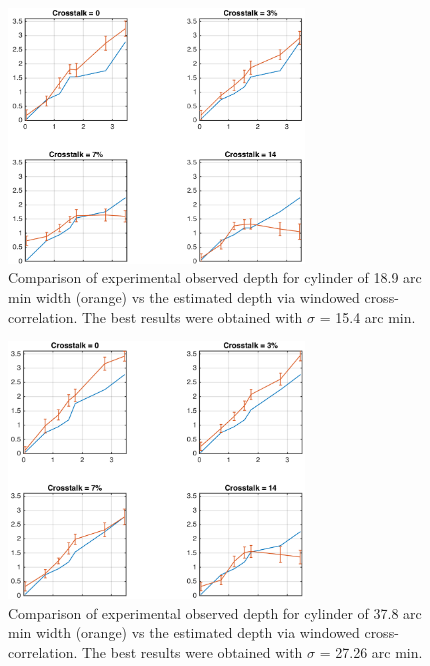 \begin{figure}[H]
\centering
    \includegraphics[width=0.7\textwidth]{./Template_Figures/s_9_sigma_7_4}
    \caption{Comparison of experimental observed depth for cylinder of 18.9 arc min width (orange) vs the estimated depth via windowed cross-correlation. The best results were obtained with $\sigma$ = 15.4 arc min.\label{fig:s_9_sigma_7_4}}
\end{figure}
\begin{figure}[H]
\centering
    \includegraphics[width=0.7\textwidth]{./Template_Figures/s_18_sigma_14_7}
    \caption{Comparison of experimental observed depth for cylinder of 37.8 arc min width (orange) vs the estimated depth via windowed cross-correlation. The best results were obtained with $\sigma$ = 27.26 arc min.\label{fig:s_18_sigma_14_7}}
\end{figure}
